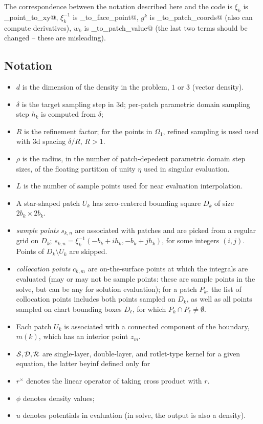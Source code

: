 \documentclass[10pt]{article}
\newcommand{\cS}{{\cal S}}
\newcommand{\cD}{{\cal D}}
\newcommand{\cR}{{\cal R}}
\begin{document}
The correspondence between the notation described here and the code is
$\xi_k$ is \verb@face_point_to_xy@, $\xi_k^{-1}$
is \verb@xy_to_face_point@, $g^k$ is \verb@xy_to_patch_coords@ (also
can compute derivatives), $w_k$ is \verb@xy_to_patch_value@ (the last two terms should be
changed -- these are misleading).


\subsection*{Notation}

\begin{itemize}
\item $d$ is the dimension of the density in the problem, $1$ or $3$ (vector density).
\item $\delta$  is the target sampling step in 3d;
per-patch parametric domain sampling step $h_k$  is computed from $\delta$;
\item $R$ is the refinement factor; for the points in $\Omega_1$, refined
sampling is used  used with 3d spacing $\delta/R$, $R > 1$.				      
\item $\rho$ is the radius, in the number of patch-depedent
parametric domain step sizes, of the floating partition of unity $\eta$ used
in singular evaluation.
\item $L$ is the number of sample points used for near evaluation interpolation. 				      
\item  A star-shaped patch $U_k$ has zero-centered bounding square
$D_k$ of size $2b_k \times 2b_k$.
\item \emph{sample points} $s_{k,n}$ are associated with patches and are picked
from a regular grid on $D_k$; $s_{k,n} = \xi_k^{-1}( -b_k + i h_k,
-b_k + j h_k)$, for some integers $(i,j)$.  Points of $D_k \setminus U_k$ are
skipped.  
\item \emph{collocation points} $c_{k,m}$  are on-the-surface points
at which the integrals are evaluated  (may or may not be sample
points: these are sample points in the solve, but can be any for
solution  evaluation); for a patch $P_k$, the list of collocation points includes both
points sampled on $D_k$, as well as all points sampled on chart
bounding boxes $D_\ell$, for which $P_k \cap P_\ell \neq \emptyset$.

\item Each patch $U_k$ is associated with a connected component of the boundary, $m(k)$, which has an
  interior point $z_m$.
 
\item $\cS, \cD, \cR$ are single-layer, double-layer, and rotlet-type kernel
for a given equation, the latter beyinf defined only for 
\item  $ r^\times $ denotes the  linear operator of taking cross product with $r$. 
\item $\phi$ denotes density values;
\item $u$ denotes potentials in evaluation (in solve, the output is also a density).
\end{itemize}
\end{document}
